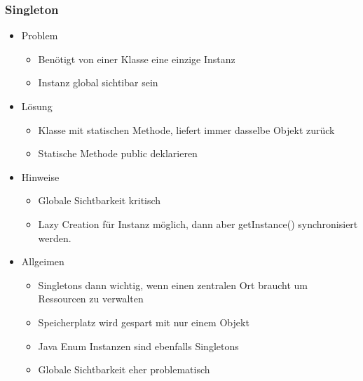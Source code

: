 \documentclass[../ZF_SWEN1.tex]{subfiles}
\begin{document}
\subsubsection{Singleton}
\begin{itemize}
	\item Problem
	\begin{itemize}
		\item Benötigt von einer Klasse eine einzige Instanz
		\item Instanz global sichtibar sein
	\end{itemize}
	\item Lösung
	\begin{itemize}
		\item Klasse mit statischen Methode, liefert immer dasselbe Objekt zurück
		\item Statische Methode public deklarieren
	\end{itemize}
	\item Hinweise
	\begin{itemize}
		\item Globale Sichtbarkeit kritisch
		\item Lazy Creation für Instanz möglich, dann aber getInstance() synchronisiert werden.
	\end{itemize}
	\item Allgeimen
	\begin{itemize}
		\item Singletons dann wichtig, wenn einen zentralen Ort braucht um Ressourcen zu verwalten
		\item Speicherplatz wird gespart mit nur einem Objekt
		\item Java Enum Instanzen sind ebenfalls Singletons
		\item Globale Sichtbarkeit eher problematisch
	\end{itemize}
\end{itemize}
\end{document}
